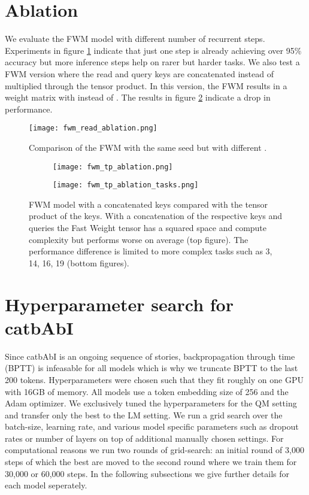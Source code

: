 \documentclass{article} \usepackage{iclr2021_conference,times}
\begin{document}
\section{Ablation}
\label{appendix:sec:ablation}
We evaluate the FWM model with different number of recurrent steps. Experiments in figure \ref{appendix:fig:readAblation} indicate that just one step is already achieving over 95\% accuracy but more inference steps help on rarer but harder tasks. We also test a FWM version where the read and query keys are concatenated instead of multiplied through the tensor product. In this version, the FWM results in a weight matrix with  instead of . The results in figure \ref{appendix:fig:productAblation} indicate a drop in performance.

\begin{figure}[H]
  \centering
\texttt{[image: fwm\_read\_ablation.png]}
  \caption{Comparison of the FWM with the same seed but with different . }
  \label{appendix:fig:readAblation}
\end{figure}

\begin{figure}[H]
  \centering
\begin{subfigure}[b]{\textwidth}
    \texttt{[image: fwm\_tp\_ablation.png]}
  \end{subfigure}
  \begin{subfigure}[b]{\textwidth}
    \texttt{[image: fwm\_tp\_ablation\_tasks.png]}
  \end{subfigure}
  \caption{FWM model with a concatenated keys compared with the tensor product of the keys. With a concatenation of the respective keys and queries the Fast Weight tensor has a squared space and compute complexity  but performs worse on average (top figure). The performance difference is limited to more complex tasks such as 3, 14, 16, 19 (bottom figures).}
  \label{appendix:fig:productAblation}
\end{figure}

\newpage
\section{Hyperparameter search for catbAbI}
\label{appendix:sec:catbAbIparams}
Since catbAbI is an ongoing sequence of stories, backpropagation through time (BPTT) is infeasable for all models which is why we truncate BPTT to the last 200 tokens.
Hyperparameters were chosen such that they fit roughly on one GPU with 16GB of memory.
All models use a token embedding size of 256 and the Adam optimizer. 
We exclusively tuned the hyperparameters for the QM setting and transfer only the best to the LM setting. 
We run a grid search over the batch-size, learning rate, and various model specific parameters such as dropout rates or number of layers on top of additional manually chosen settings. For computational reasons we run two rounds of grid-search: an initial round of 3,000 steps of which the best are moved to the second round where we train them for 30,000 or 60,000 steps. In the following subsections we give further details for each model seperately. 
\end{document}
